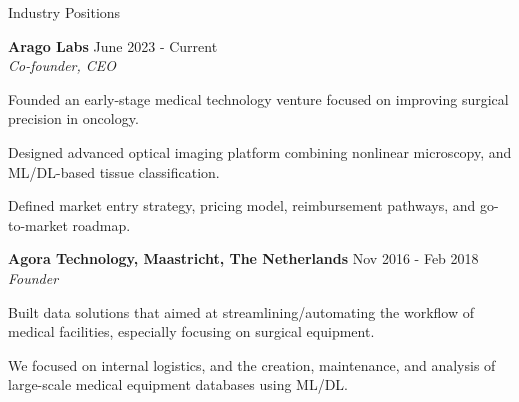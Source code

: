 \documentclass{resume}
\begin{document}
\begin{sections}{Industry Positions}

{\bf Arago Labs} \hfill {June 2023 - Current} 
\\{\textit{Co-founder, CEO}}
\begin{resumeitemize}
\item Founded an early-stage medical technology venture focused on improving surgical precision in oncology.
\item Designed advanced optical imaging platform combining nonlinear microscopy, and ML/DL-based tissue classification.
\item Defined market entry strategy, pricing model, reimbursement pathways, and go-to-market roadmap.
\end{resumeitemize}

{\bf Agora Technology, Maastricht, The Netherlands} \hfill {Nov 2016 - Feb 2018} 
\\{\textit{Founder}}
\begin{resumeitemize}
\item Built data solutions that aimed at streamlining/automating the workflow of medical facilities, especially focusing on surgical equipment.
\item We focused on internal logistics, and the creation, maintenance, and analysis of large-scale medical equipment databases using ML/DL.
\end{resumeitemize}

\end{sections}

\newpage
\end{document}
